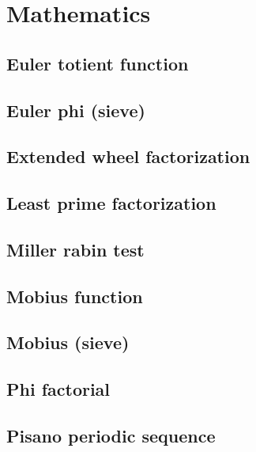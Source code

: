 \section{Mathematics}
\subsection{Euler totient function}
\raggedbottom
\hrulefill
\subsection{Euler phi (sieve)}
\raggedbottom
\hrulefill
\subsection{Extended wheel factorization}
\raggedbottom
\hrulefill
\subsection{Least prime factorization}
\raggedbottom
\hrulefill
\subsection{Miller rabin test}
\raggedbottom
\hrulefill
\subsection{Mobius function}
\raggedbottom
\hrulefill
\subsection{Mobius (sieve)}
\raggedbottom
\hrulefill
\subsection{Phi factorial}
\raggedbottom
\hrulefill
\subsection{Pisano periodic sequence}
\raggedbottom
\hrulefill

